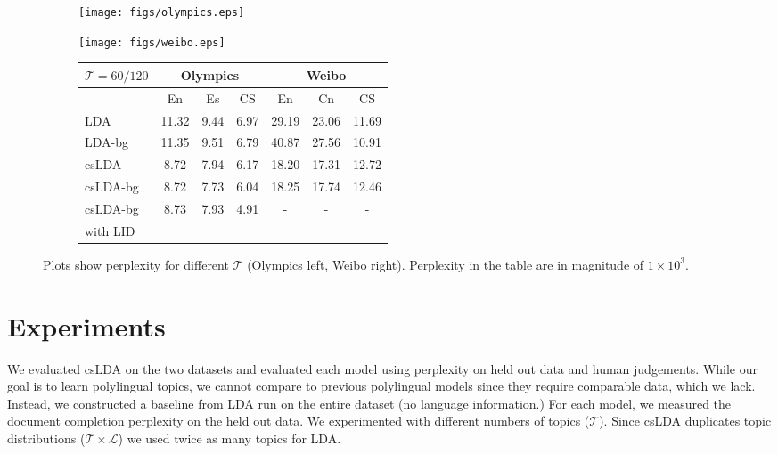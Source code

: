 \documentclass[11pt]{article}
\begin{document}





\begin{figure*}
\ffigbox
{
\hspace{-4cm}
 \begin{subfigure}[bl]{0.35\textwidth}
      \texttt{[image: figs/olympics.eps]}
 \end{subfigure}   
 \hspace{-1.3cm}
 \begin{subfigure}[bl]{0.35\textwidth}
     \texttt{[image: figs/weibo.eps]}
 \end{subfigure}
 \hspace{-1.3cm}
 \begin{subfigure}[bl]{0.3\textwidth}
    \scriptsize
  \begin{tabular}{ |l|ccc|ccc|}
  \hline
 $\mathcal{T}$$=$$60/120$ &\multicolumn{3}{|c|}{{\bf Olympics}} & \multicolumn{3}{|c|}{{\bf Weibo}}\\
  \hline
  & En & Es & CS & En & Cn & CS \\
  \hline
  LDA & 11.32 & 9.44 & 6.97 & 29.19 & 23.06 & 11.69 \\
  LDA-bg &  11.35 & 9.51 & 6.79 & 40.87 & 27.56 & 10.91 \\
  \hline
  csLDA & 8.72 & 7.94 & 6.17 & 18.20 & 17.31 & 12.72 \\
  csLDA-bg &  8.72 & 7.73 & 6.04 & 18.25 & 17.74 & 12.46 \\
  \hline
  csLDA-bg &  8.73 & 7.93 & 4.91 & - & - & - \\
  with LID & & & & & & \\
 \hline
\end{tabular}
\end{subfigure}
}
{
  \caption{Plots show perplexity for different $\mathcal{T}$ (Olympics left, Weibo right). Perplexity in the table are in magnitude of $1\times 10^3$.
  }%
\label{fig:perplexity}
}
\end{figure*}
\section{Experiments}
We evaluated csLDA on the two datasets and evaluated each model using perplexity on held out data and human judgements.
While our goal is to learn polylingual topics, we cannot compare to previous polylingual models since they require comparable data, 
which we lack. Instead, we constructed a baseline from
LDA run on the entire dataset (no language information.)
For each model, we measured the document completion perplexity \cite{rosen2004author} on the held out data.
We experimented with different numbers of topics ($\mathcal{T}$). Since csLDA duplicates topic
distributions ($\mathcal{T}\times\mathcal{L}$)
we used twice as many topics for LDA.
\end{document}
